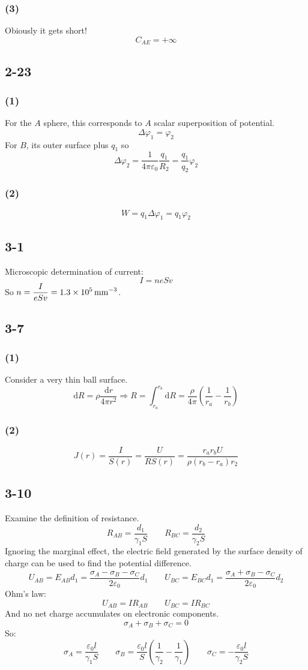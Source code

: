 \documentclass[a4paper,11pt]{amsart}
\theoremstyle{definition}
\begin{document}
	\subsubsection*{(3)}
	Obiously it gets short!
	$$
	C_{AE}=+\infty
	$$
	\subsection*{2-23}
	\subsubsection*{(1)}
	For the $A$ sphere, this corresponds to $A$ scalar superposition of potential.
	$$
	\Delta \varphi_1=\varphi_2
	$$
	For $B$, its outer surface plus $q_1$ so
	$$
	\Delta\varphi_2=\frac{1}{4\pi \varepsilon _0}\frac{q_1}{R_2}=\frac{q_1}{q_2}\varphi _2
	$$
	\subsubsection*{(2)}
	$$
	W=q_1\Delta\varphi_1=q_1\varphi_2
	$$
	\subsection*{3-1}
	Microscopic determination of current:
	$$
	I=neSv
	$$
	So $\displaystyle n=\dfrac{I}{eSv}=1.3\times 10^5\thinspace\mathrm{mm^{-3}}$.
	\subsection*{3-7}
	\subsubsection*{(1)}
	Consider a very thin ball surface.
	$$
	\mathrm{d}R=\rho \frac{\mathrm{d}r}{4\pi r^2}\Longrightarrow R=\int_{r_a}^{r_b}{\mathrm{d}R=\frac{\rho}{4\pi}\left( \frac{1}{r_a}-\frac{1}{r_b} \right)}
	$$
	\subsubsection*{(2)}
	$$
	J(r)=\dfrac{I}{S(r)}=\dfrac{U}{RS(r)}=\frac{r_ar_bU}{\rho \left( r_b-r_a \right) r_2}
	$$
	\subsection*{3-10}
	Examine the definition of resistance.
	$$
	R_{AB}=\dfrac{d_1}{\gamma_1S}\qquad R_{BC}=\dfrac{d_2}{\gamma_2S}
	$$
	Ignoring the marginal effect, the electric field generated by the surface density of charge can be used to find the potential difference.
	$$
	U_{AB}=E_{AB}d_1=\frac{\sigma _A-\sigma _B-\sigma _C}{2\varepsilon _0}d_1\qquad U_{BC}=E_{BC}d_1=\frac{\sigma _A+\sigma _B-\sigma _C}{2\varepsilon _0}d_2
	$$
	Ohm's law:
	$$
	U_{AB}=IR_{AB}\qquad U_{BC}=IR_{BC}
	$$
	And no net charge accumulates on electronic components.
	$$
	\sigma_A+\sigma_B+\sigma_C=0
	$$
	So:
	$$
	\sigma _A=\frac{\varepsilon _0l}{\gamma _1S}\qquad \sigma _B=\frac{\varepsilon _0l}{S}\left( \frac{1}{\gamma _2}-\frac{1}{\gamma _1} \right) \qquad \sigma _C=-\frac{\varepsilon _0l}{\gamma _2S}
	$$
\end{document}
